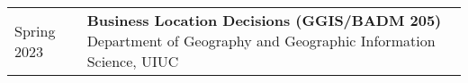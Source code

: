 \documentclass{acmcv}
\begin{document}







    
\vspace*{0.25cm}


    \begin{longtable}{p{0.16\linewidth} p{0.84\linewidth}}
        Spring 2023 & \textbf{Business Location Decisions (GGIS/BADM 205)} \newline Department of Geography and Geographic Information Science, UIUC \\

    \end{longtable}
\end{document}
